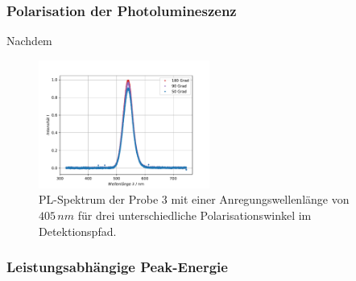 	\subsubsection{Polarisation der Photolumineszenz}
Nachdem 
\begin{figure}[hbtp]
	\centering
	\includegraphics[width=0.5\textwidth]{Plots/aufgabe1b.pdf}
	\caption{PL-Spektrum der Probe 3 mit einer Anregungswellenl\"{a}nge von $405 \, nm$ f\"{u}r drei unterschiedliche Polarisationswinkel im Detektionspfad.}
	\label{abb:polarisation}
\end{figure}

	\subsubsection{Leistungsabh\"{a}ngige Peak-Energie}

